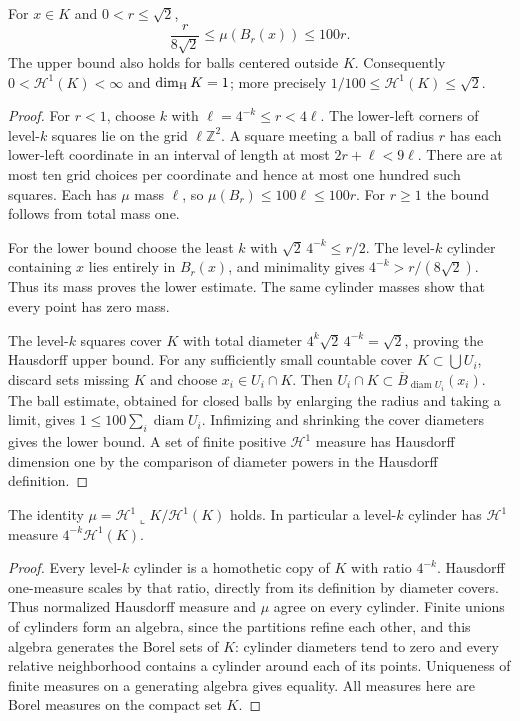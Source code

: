 \begin{proposition}\label{prop:four-corner-linear-measure}
For $x\in K$ and $0<r\le\sqrt2$,
\[
 \frac{r}{8\sqrt2}\le\mu(B_r(x))\le100r.
\]
The upper bound also holds for balls centered outside $K$. Consequently $0<\mathcal H^1(K)<\infty$ and $\dim_{\rm H}K=1$; more precisely $1/100\le\mathcal H^1(K)\le\sqrt2$.
\end{proposition}
\begin{proof}
For $r<1$, choose $k$ with $\ell=4^{-k}\le r<4\ell$. The lower-left corners of level-$k$ squares lie on the grid $\ell\mathbb Z^2$. A square meeting a ball of radius $r$ has each lower-left coordinate in an interval of length at most $2r+\ell<9\ell$. There are at most ten grid choices per coordinate and hence at most one hundred such squares. Each has $\mu$ mass $\ell$, so $\mu(B_r)\le100\ell\le100r$. For $r\ge1$ the bound follows from total mass one.

For the lower bound choose the least $k$ with $\sqrt2\,4^{-k}\le r/2$. The level-$k$ cylinder containing $x$ lies entirely in $B_r(x)$, and minimality gives $4^{-k}>r/(8\sqrt2)$. Thus its mass proves the lower estimate. The same cylinder masses show that every point has zero mass.

The level-$k$ squares cover $K$ with total diameter $4^k\sqrt2\,4^{-k}=\sqrt2$, proving the Hausdorff upper bound. For any sufficiently small countable cover $K\subset\bigcup U_i$, discard sets missing $K$ and choose $x_i\in U_i\cap K$. Then $U_i\cap K\subset\overline B_{\operatorname{diam}U_i}(x_i)$. The ball estimate, obtained for closed balls by enlarging the radius and taking a limit, gives $1\le100\sum_i\operatorname{diam}U_i$. Infimizing and shrinking the cover diameters gives the lower bound. A set of finite positive $\mathcal H^1$ measure has Hausdorff dimension one by the comparison of diameter powers in the Hausdorff definition.
\end{proof}

\begin{proposition}\label{prop:four-corner-hausdorff-measure}
The identity $\mu=\mathcal H^1\llcorner K/\mathcal H^1(K)$ holds. In particular a level-$k$ cylinder has $\mathcal H^1$ measure $4^{-k}\mathcal H^1(K)$.
\end{proposition}
\begin{proof}
Every level-$k$ cylinder is a homothetic copy of $K$ with ratio $4^{-k}$. Hausdorff one-measure scales by that ratio, directly from its definition by diameter covers. Thus normalized Hausdorff measure and $\mu$ agree on every cylinder. Finite unions of cylinders form an algebra, since the partitions refine each other, and this algebra generates the Borel sets of $K$: cylinder diameters tend to zero and every relative neighborhood contains a cylinder around each of its points. Uniqueness of finite measures on a generating algebra gives equality. All measures here are Borel measures on the compact set $K$.
\end{proof}

